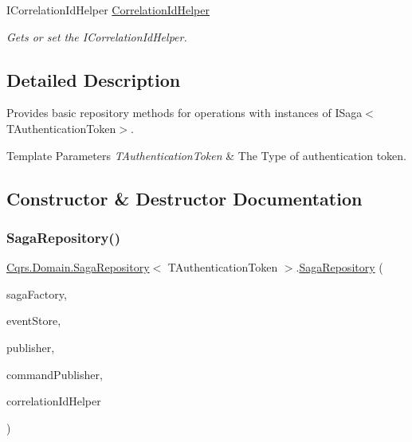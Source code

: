 \begin{DoxyCompactItemize}
I\+Correlation\+Id\+Helper \hyperlink{classCqrs_1_1Domain_1_1SagaRepository_a654f9f7c2130864d63515f1504a750fd_a654f9f7c2130864d63515f1504a750fd}{Correlation\+Id\+Helper}
\begin{DoxyCompactList}\small\item\em Gets or set the I\+Correlation\+Id\+Helper. \end{DoxyCompactList}\end{DoxyCompactItemize}


\subsection{Detailed Description}
Provides basic repository methods for operations with instances of I\+Saga$<$\+T\+Authentication\+Token$>$. 


\begin{DoxyTemplParams}{Template Parameters}
{\em T\+Authentication\+Token} & The Type of authentication token.\\
\hline
\end{DoxyTemplParams}


\subsection{Constructor \& Destructor Documentation}
\mbox{\label{classCqrs_1_1Domain_1_1SagaRepository_ab444c7f3ace1ee0350d9f396345c395d_ab444c7f3ace1ee0350d9f396345c395d}} 
\subsubsection{\texorpdfstring{Saga\+Repository()}{SagaRepository()}}
{\footnotesize\ttfamily \hyperlink{classCqrs_1_1Domain_1_1SagaRepository}{Cqrs.\+Domain.\+Saga\+Repository}$<$ T\+Authentication\+Token $>$.\hyperlink{classCqrs_1_1Domain_1_1SagaRepository}{Saga\+Repository} (\begin{DoxyParamCaption}\item[{\hyperlink{interfaceCqrs_1_1Domain_1_1Factories_1_1IAggregateFactory}{I\+Aggregate\+Factory}}]{saga\+Factory,  }\item[{\hyperlink{interfaceCqrs_1_1Events_1_1IEventStore}{I\+Event\+Store}$<$ T\+Authentication\+Token $>$}]{event\+Store,  }\item[{\hyperlink{interfaceCqrs_1_1Events_1_1IEventPublisher}{I\+Event\+Publisher}$<$ T\+Authentication\+Token $>$}]{publisher,  }\item[{\hyperlink{interfaceCqrs_1_1Commands_1_1ICommandPublisher}{I\+Command\+Publisher}$<$ T\+Authentication\+Token $>$}]{command\+Publisher,  }\item[{I\+Correlation\+Id\+Helper}]{correlation\+Id\+Helper }\end{DoxyParamCaption})}



